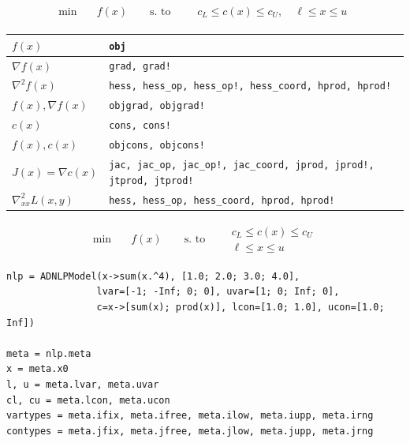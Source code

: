 \begin{frame}[fragile,t]
  \begin{align*}
    \min & \quad f(x) \qquad
    \mbox{s. to} \qquad
    \begin{array}{l}
      c_L \leq c(x) \leq c_U, \quad
      \ell \leq x \leq u
    \end{array}
  \end{align*}
  \begin{tabular}{|l|l|} \hline
    $f(x)$ &
      \verb+obj+ \\ \hline
    $\nabla f(x)$ &
      \verb+grad, grad!+ \\ \hline
    $\nabla^2 f(x)$ &
      \verb+hess, hess_op, hess_op!, hess_coord, hprod, hprod!+ \\ \hline
    $f(x), \nabla f(x)$ &
      \verb+objgrad, objgrad!+ \\ \hline
    $c(x)$ &
      \verb+cons, cons!+ \\ \hline
    $f(x), c(x)$ &
      \verb+objcons, objcons!+ \\ \hline
    $J(x) = \nabla c(x)$ &
      \verb+jac, jac_op, jac_op!, jac_coord, jprod, jprod!, jtprod, jtprod!+ \\ \hline
    $\nabla_{xx}^2 L(x,y)$ &
      \verb+hess, hess_op, hess_coord, hprod, hprod!+ \\ \hline
  \end{tabular}
\end{frame}

\begin{frame}[fragile,t]
  \begin{align*}
    \min & \quad f(x) \qquad
    \mbox{s. to} \qquad
    \begin{array}{l}
      c_L \leq c(x) \leq c_U \\
      \ell \leq x \leq u
    \end{array}
  \end{align*}
\begin{lstlisting}
nlp = ADNLPModel(x->sum(x.^4), [1.0; 2.0; 3.0; 4.0],
                lvar=[-1; -Inf; 0; 0], uvar=[1; 0; Inf; 0],
                c=x->[sum(x); prod(x)], lcon=[1.0; 1.0], ucon=[1.0; Inf])

meta = nlp.meta
x = meta.x0
l, u = meta.lvar, meta.uvar
cl, cu = meta.lcon, meta.ucon
vartypes = meta.ifix, meta.ifree, meta.ilow, meta.iupp, meta.irng
contypes = meta.jfix, meta.jfree, meta.jlow, meta.jupp, meta.jrng
\end{lstlisting}
\end{frame}

